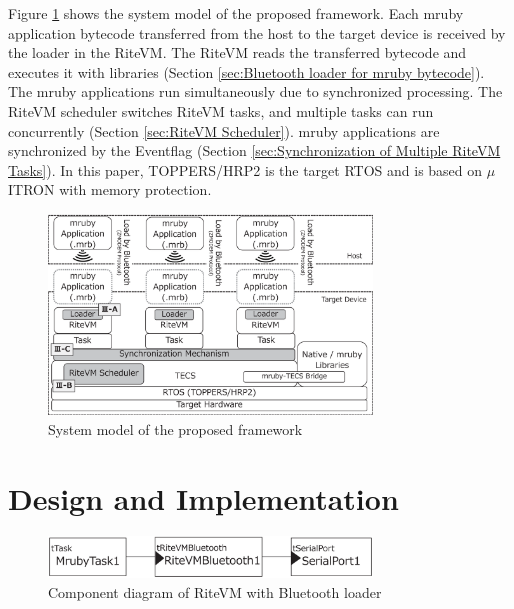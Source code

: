 \documentclass[conference]{IEEEtran/IEEEtran/IEEEtran}
\begin{document}
Figure \ref{fig:system_model} shows the system model of the proposed framework.
Each mruby application bytecode transferred from the host to the target device is received by the loader in the RiteVM.
The RiteVM reads the transferred bytecode and executes it with libraries (Section \ref{sec:Bluetooth loader for mruby bytecode}).
The mruby applications run simultaneously due to synchronized processing.
The RiteVM scheduler switches RiteVM tasks, and multiple tasks can run concurrently (Section \ref{sec:RiteVM Scheduler}).
mruby applications are synchronized by the Eventflag (Section \ref{sec:Synchronization of Multiple RiteVM Tasks}).
In this paper, TOPPERS/HRP2 \cite{par:hr-tecs} is the target RTOS and is based on $\mu$ITRON \cite{par:microITRON} with memory protection.

\begin{figure}[t]
    \centering
    \includegraphics[width=8.6cm,clip]{figure/system_model.eps}
    \vspace{-3mm}
\caption{System model of the proposed framework}
    \vspace{-3mm}
\label{fig:system_model}
\end{figure}

\section{Design and Implementation}
\label{sec:Design and Implementation}

\begin{figure}[t]
    \centering
    \includegraphics[width=8.6cm,clip]{figure/component_bluetooth.eps}
    \vspace{-3mm}
\caption{Component diagram of RiteVM with Bluetooth loader}
    \vspace{-3mm}
\label{fig:component_bluetooth}
\end{figure}
\end{document}
